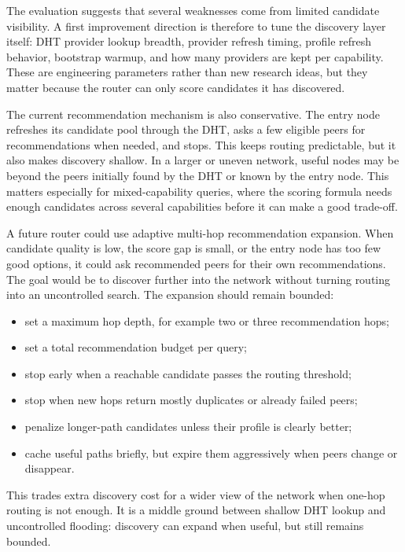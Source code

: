 The evaluation suggests that several weaknesses come from limited candidate
visibility. A first improvement direction is therefore to tune the discovery
layer itself: DHT provider lookup breadth, provider refresh timing, profile
refresh behavior, bootstrap warmup, and how many providers are kept per
capability. These are engineering parameters rather than new research ideas,
but they matter because the router can only score candidates it has discovered.

The current recommendation mechanism is also conservative. The entry node
refreshes its candidate pool through the DHT, asks a few eligible peers for
recommendations when needed, and stops. This keeps routing predictable, but it
also makes discovery shallow. In a larger or uneven network, useful nodes may
be beyond the peers initially found by the DHT or known by the entry node.
This matters especially for mixed-capability queries, where the scoring formula
needs enough candidates across several capabilities before it can make a good
trade-off.

A future router could use adaptive multi-hop recommendation expansion. When
candidate quality is low, the score gap is small, or the entry node has too
few good options, it could ask recommended peers for their own recommendations.
The goal would be to discover further into the network without turning routing
into an uncontrolled search. The expansion should remain bounded:

\begin{itemize}
  \item set a maximum hop depth, for example two or three recommendation hops;
  \item set a total recommendation budget per query;
  \item stop early when a reachable candidate passes the routing threshold;
  \item stop when new hops return mostly duplicates or already failed peers;
  \item penalize longer-path candidates unless their profile is clearly better;
  \item cache useful paths briefly, but expire them aggressively when peers
  change or disappear.
\end{itemize}

This trades extra discovery cost for a wider view of the network when one-hop
routing is not enough. It is a middle ground between shallow DHT lookup and
uncontrolled flooding: discovery can expand when useful, but still remains
bounded.

